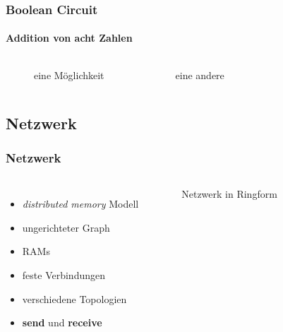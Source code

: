 \begin{frame}[b]
    \frametitle{Boolean Circuit}
    \framesubtitle{Addition von acht Zahlen}
    \begin{columns}[b]
        \begin{figure}
            \centering
            
            \caption{eine Möglichkeit}
        \end{figure}
        \pause
        \begin{figure}
            \centering
            
            \caption{eine andere}
        \end{figure}
    \end{columns}
\end{frame}

\subsection{Netzwerk}
\begin{frame}
    \frametitle{Netzwerk}
    \begin{columns}
        \begin{itemize}
            \item \emph{distributed memory} Modell
            \item ungerichteter Graph
            \item RAMs
            \item feste Verbindungen
            \item verschiedene Topologien
            \item \textbf{send} und \textbf{receive}
        \end{itemize}
        \begin{figure}
            \centering
            
            \caption{Netzwerk in Ringform}
        \end{figure}
    \end{columns}
\end{frame}

